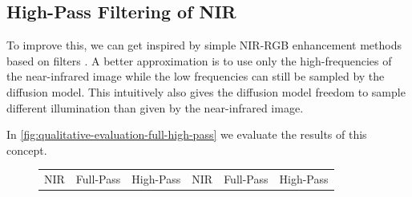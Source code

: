 \subsection{High-Pass Filtering of NIR}

To improve this, we can get inspired by simple NIR-RGB enhancement methods based on filters \parencite{rgb-nir-image-enhancement}.
A better approximation is to use only the high-frequencies of the near-infrared image while the low frequencies can still be sampled by the diffusion model.
This intuitively also gives the diffusion model freedom to sample different illumination than given by the near-infrared image.

In \autoref{fig:qualitative-evaluation-full-high-pass} we evaluate the results of this concept. 

\begin{figure}[htp!]
    \centering
    \begin{tabularx}{\textwidth}{>{\centering\arraybackslash}X >{\centering\arraybackslash}X >{\centering\arraybackslash}X >{\centering\arraybackslash}X >{\centering\arraybackslash}X >{\centering\arraybackslash}X}
        NIR & Full-Pass & High-Pass & NIR & Full-Pass & High-Pass \\

\end{tabularx}
\end{figure}
